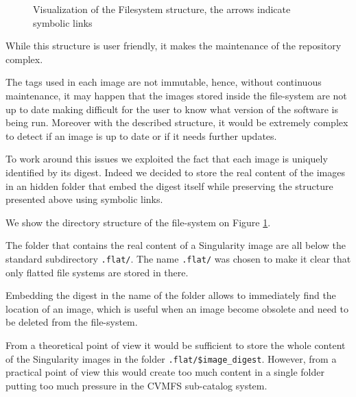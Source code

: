 \begin{figure}
\caption{Visualization of the Filesystem structure, the arrows indicate symbolic links}
\label{fig:simple-fs}
\end{figure}

While this structure is user friendly, it makes the maintenance of the
repository complex.

The tags used in each image are not immutable, hence, without continuous
maintenance, it may happen that the images stored inside the file-system are
not up to date making difficult for the user to know what version of the
software is being run.  Moreover with the described structure, it would be
extremely complex to detect if an image is up to date or if it needs further
updates.

To work around this issues we exploited the fact that each image is uniquely
identified by its digest.  Indeed we decided to store the real content of the
images in an hidden folder that embed the digest itself while preserving the
structure presented above using symbolic links.

We show the directory structure of the file-system on Figure
\ref{fig:simple-fs}.

The folder that contains the real content of a Singularity image are all below
the standard subdirectory \texttt{.flat/}.  The name \texttt{.flat/} was chosen
to make it clear that only flatted file systems are stored in there.

Embedding the digest in the name of the folder allows to immediately find the
location of an image, which is useful when an image become obsolete and need to
be deleted from the file-system.

From a theoretical point of view it would be sufficient to store the whole
content of the Singularity images in the folder \texttt{.flat/\$image\_digest}.
However, from a practical point of view this would create too much content in a
single folder putting too much pressure in the CVMFS sub-catalog system.

